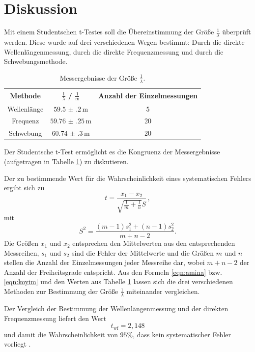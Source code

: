\section{Diskussion}
\label{sec:Diskussion}
Mit einem Studentschen t-Testes soll die Übereinstimmung der Größe $\frac{1}{\lambda}$
überprüft werden. Diese wurde auf drei verschiedenen Wegen bestimmt: Durch die direkte
Wellenlängenmessung, durch die direkte Frequenzmessung und durch die Schwebungsmethode.

\begin{table}
	\centering
	\caption{Messergebnisse der Größe $\frac{1}{\lambda}$.}
	\label{tab:alam}
	\begin{tabular}{ccc}
		\toprule
		Methode      & $\frac{1}{\lambda}$ / $\frac{1}{\si{\meter}}$ & Anzahl der Einzelmessungen \\
		\midrule
		Wellenlänge & $\num{59.5(2)} \, \si{\meter}$                & 5                          \\
		Frequenz     & $\num{59.76(25)} \, \si{\meter}$              & 20                         \\
		Schwebung    & $\num{60.74(30)} \, \si{\meter}$              & 20                         \\
		\bottomrule
	\end{tabular}
\end{table}
Der Studentsche t-Test ermöglicht es die Kongruenz der Messergebnisse (aufgetragen in Tabelle
\ref{tab:alam}) zu diskutieren.

Der zu bestimmende Wert \cite{ttest} für die  Wahrscheinlichkeit eines systematischen Fehlers
ergibt sich zu
\begin{equation}
	\label{eqn:amina}
	t = \frac{x_1 - x_2}{\sqrt{\frac{1}{m} + \frac{1}{n}} S} \, \mathrm{,}
\end{equation}
mit
\begin{equation}
	\label{eqn:koyim}
	S^2 = \frac{(m-1)s_1^2 + (n-1)s_2^2}{m+n-2} \mathrm{.}
\end{equation}
Die Größen $x_1$ und $x_2$ entsprechen den Mittelwerten aus den entsprechenden Messreihen,
$s_1$ und $s_2$ sind die Fehler der Mittelwerte und die Größen $m$ und $n$ stellen die
Anzahl der Einzelmessungen jeder Messreihe dar, wobei $m+n-2$ der Anzahl der Freiheitsgrade
entspricht.
Aus den Formeln \eqref{eqn:amina} bzw. \eqref{eqn:koyim} und den Werten aus Tabelle
\ref{tab:alam} lassen sich die drei verschiedenen Methoden zur Bestimmung der Größe
$\frac{1}{\lambda}$ miteinander vergleichen.

Der Vergleich der Bestimmung der Wellenlängenmessung und der direkten Frequenzmessung liefert
den Wert
\begin{equation*}
	t_{\mathrm{wf}} = 2,148
\end{equation*}
und damit die Wahrscheinlichkeit von $95\%$, dass kein systematischer Fehler vorliegt \cite{tttest}.

